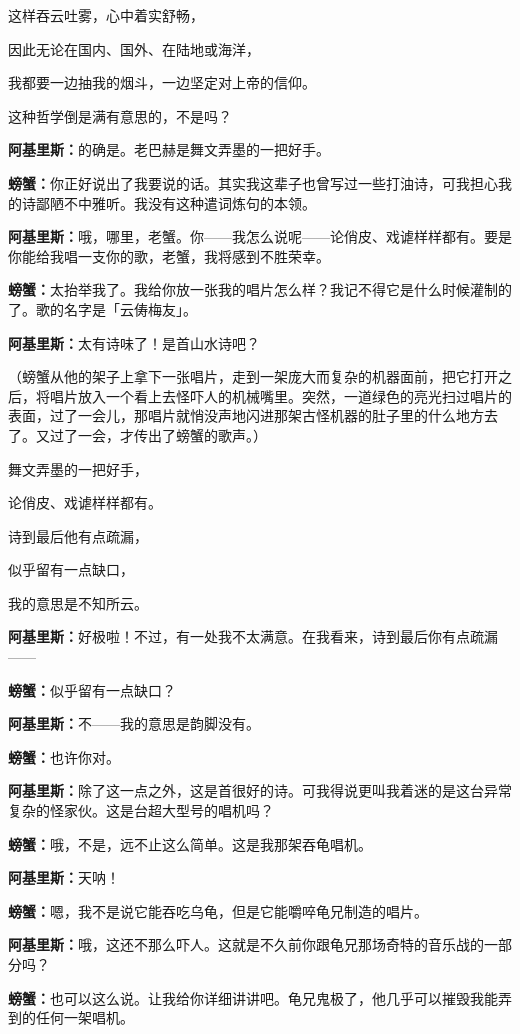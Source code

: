 \documentclass[
  12pt,
  twoside,
  openright,
  oldfontcommands,
]{memoir}
\newcommand{\dialogname}[1]{{\heifamily\bfseries #1}}
\begin{document}
这样吞云吐雾，心中着实舒畅，

因此无论在国内、国外、在陆地或海洋，

我都要一边抽我的烟斗，一边坚定对上帝的信仰。

这种哲学倒是满有意思的，不是吗？

\dialogname{阿基里斯：}的确是。老巴赫是舞文弄墨的一把好手。

\dialogname{螃蟹：}你正好说出了我要说的话。其实我这辈子也曾写过一些打油诗，可我担心我的诗鄙陋不中雅听。我没有这种遣词炼句的本领。

\dialogname{阿基里斯：}哦，哪里，老蟹。你------我怎么说呢------论俏皮、戏谑样样都有。要是你能给我唱一支你的歌，老蟹，我将感到不胜荣幸。

\dialogname{螃蟹：}太抬举我了。我给你放一张我的唱片怎么样？我记不得它是什么时候灌制的了。歌的名字是「云俦梅友」。

\dialogname{阿基里斯：}太有诗味了！是首山水诗吧？

（螃蟹从他的架子上拿下一张唱片，走到一架庞大而复杂的机器面前，把它打开之后，将唱片放入一个看上去怪吓人的机械嘴里。突然，一道绿色的亮光扫过唱片的表面，过了一会儿，那唱片就悄没声地闪进那架古怪机器的肚子里的什么地方去了。又过了一会，才传出了螃蟹的歌声。）

舞文弄墨的一把好手，

论俏皮、戏谑样样都有。

诗到最后他有点疏漏，

似乎留有一点缺口，

我的意思是不知所云。

\dialogname{阿基里斯：}好极啦！不过，有一处我不太满意。在我看来，诗到最后你有点疏漏------

\dialogname{螃蟹：}似乎留有一点缺口？

\dialogname{阿基里斯：}不------我的意思是韵脚没有。

\dialogname{螃蟹：}也许你对。

\dialogname{阿基里斯：}除了这一点之外，这是首很好的诗。可我得说更叫我着迷的是这台异常复杂的怪家伙。这是台超大型号的唱机吗？

\dialogname{螃蟹：}哦，不是，远不止这么简单。这是我那架吞龟唱机。

\dialogname{阿基里斯：}天呐！

\dialogname{螃蟹：}嗯，我不是说它能吞吃乌龟，但是它能嚼啐龟兄制造的唱片。

\dialogname{阿基里斯：}哦，这还不那么吓人。这就是不久前你跟龟兄那场奇特的音乐战的一部分吗？

\dialogname{螃蟹：}也可以这么说。让我给你详细讲讲吧。龟兄鬼极了，他几乎可以摧毁我能弄到的任何一架唱机。
\end{document}
